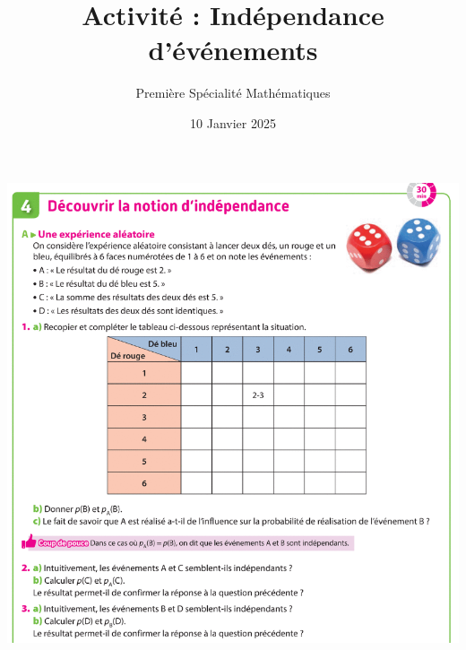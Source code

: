 \documentclass{article}
\title{Activité : Indépendance d'événements}
\author{Première Spécialité Mathématiques}
\date{10 Janvier 2025}
\begin{document}
\maketitle

\begin{center}
\includegraphics[width=\textwidth]{Activite_1.png}
\end{center}
\end{document}
